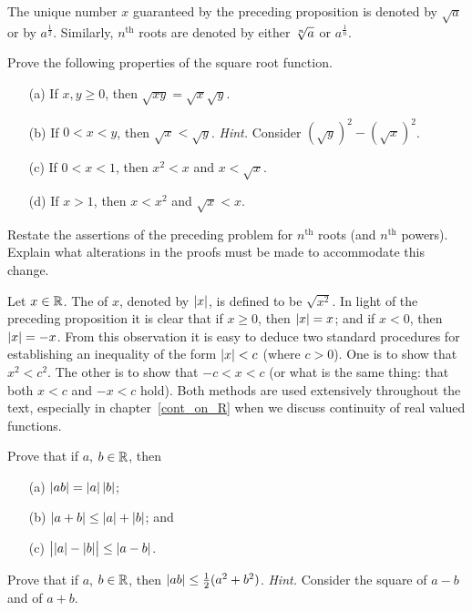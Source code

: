\begin{notn}  The unique number $x$ guaranteed by the preceding proposition is denoted by
$\sqrt a$ or by $a^{\frac 12}$.  Similarly, $n^{\text{th}}$ roots are denoted by either $\root
n \of a$ or $a^{\frac1n}$.
\end{notn}

\begin{prob} Prove the following properties of the square root function.
 \begin{enumerate}
  \item[(a)] If $x,y \ge 0$, then $\sqrt{xy} = \sqrt x \sqrt y$.
  \item[(b)] If $0 < x < y$, then $\sqrt x < \sqrt y$. \emph{Hint.} Consider
$(\sqrt y)^2 - (\sqrt x)^2$.
  \item[(c)] If $0 < x < 1$, then $x^2 < x$ and $x < \sqrt x$.
  \item[(d)] If $x > 1$, then $x < x^2$ and $\sqrt x < x$.
 \end{enumerate}
\end{prob}

\begin{prob}\label{proj_nth_roots}  Restate the assertions of the preceding problem for
$n^{\text{th}}$ roots (and $n^{\text{th}}$ powers). Explain what alterations in the proofs
must be made to accommodate this change.
\end{prob}

\begin{defn}  Let $x \in \mathbb{R}$. The
 of $x$, denoted
by $\lvert x\rvert$, is defined to be $\sqrt{x^2}$.  In light of the preceding proposition it is clear
that if $x \ge 0$, then $\lvert x\rvert = x$; and if $x < 0$, then $\lvert x\rvert = -x$.  From this
observation it is easy to deduce two standard procedures for establishing an inequality of the
form $\lvert x\rvert < c$ (where $c > 0$).  One is to show that $x^2 < c^2$. The other is to show that
$-c < x < c$ (or what is the same thing: that both $x < c$ and $-x < c$ hold).  Both methods
are used extensively throughout the text, especially in chapter~\ref{cont_on_R} when we
discuss continuity of real valued functions.
\end{defn}

\begin{prob}\label{prob_abs_val}  Prove that if $a$, $b \in \mathbb{R}$, then
 \begin{enumerate}
  \item[(a)] $\lvert ab\rvert = \lvert a\rvert \, \lvert b\rvert$;
  \item[(b)] $\lvert a + b\rvert \le \lvert a\rvert + \lvert b\rvert$; and
  \item[(c)] $\bigl\lvert\lvert a\rvert - \lvert b\rvert\bigr\lvert \le \lvert a-b\rvert$.
 \end{enumerate}
\end{prob}

\begin{prob}  Prove that if $a$, $b \in \mathbb{R}$, then $\lvert ab\rvert \le \frac12 (a^2 + b^2)$.  \emph{Hint.}
Consider the square of $a - b$ and of $a + b$.
\end{prob}






\endinput
